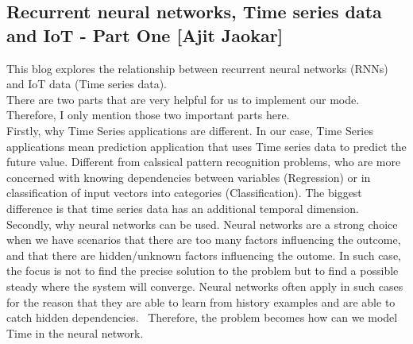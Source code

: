 \documentclass[12pt]{article}
\begin{document}
\subsection{Recurrent neural networks, Time series data and IoT - Part One [Ajit Jaokar]}
This blog explores the relationship between recurrent neural networks (RNNs) and IoT data (Time series data). \\
There are two parts that are very helpful for us to implement our mode. Therefore, I only mention those two important parts here. \\ Firstly, why Time Series applications are different. In our case, Time Series applications mean prediction application that uses Time series data to predict the future value. Different from calssical pattern recognition problems, who are more concerned with knowing dependencies between variables (Regression) or in classification of input vectors into categories (Classification). The biggest difference is that time series data has an additional temporal dimension. \\ Secondly, why neural networks can be used. Neural networks are a strong choice when we have scenarios that there are too many factors influencing the outcome, and that there are hidden/unknown factors influencing the outome. In such case, the focus is not to find the precise solution to the problem but to find a possible steady where the system will converge. Neural networks often apply in such cases for the reason that they are able to learn from history examples and are able to catch hidden dependencies. \ Therefore, the problem becomes how can we model Time in the neural network.
\end{document}
